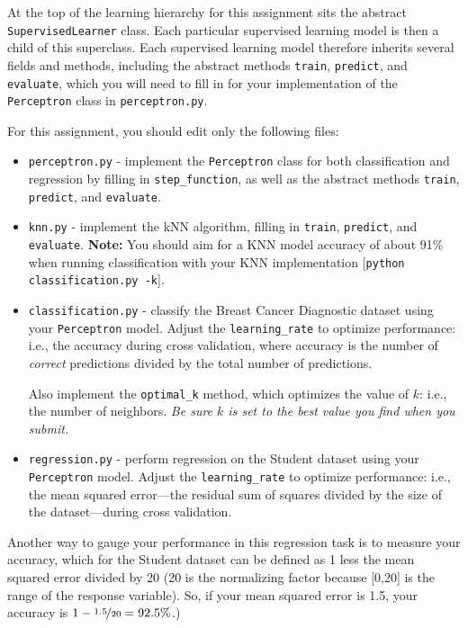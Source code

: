 \documentclass{article}
\begin{document}
At the top of the learning hierarchy for this assignment sits the abstract \verb|SupervisedLearner| class.
Each particular supervised learning model is then a child of this superclass.
Each supervised learning model therefore inherits several fields and methods,
including the abstract methods \verb|train|, \verb|predict|, and \verb|evaluate|,
which you will need to fill in for your implementation of the \verb|Perceptron| class in \verb|perceptron.py|.
\fi

For this assignment, you should edit only the following files:

\begin{itemize}
\item \verb|perceptron.py| - implement the \verb|Perceptron| class for both classification and regression by filling in
  \verb|step_function|, as well as the abstract methods \verb|train|, \verb|predict|, and \verb|evaluate|.

\item \verb|knn.py| - implement the kNN algorithm, filling in \verb|train|, \verb|predict|, and \verb|evaluate|. \textbf{Note:} You should aim for a KNN model accuracy of about 91\% when running classification with your KNN implementation [\verb|python classification.py -k|].

\item \verb|classification.py| - classify the Breast Cancer Diagnostic dataset using your \verb|Perceptron| model.
  Adjust the \verb|learning_rate| to optimize performance: i.e., the accuracy during cross validation,
  where accuracy is the number of \emph{correct\/} predictions divided by the total number of predictions.

  Also implement the \verb|optimal_k| method, which optimizes the value of $k$: i.e., the number of neighbors.
  \emph{Be sure $k$ is set to the best value you find when you submit.}

\item \verb|regression.py| - perform regression on the Student dataset using your \verb|Perceptron| model.
  Adjust the \verb|learning_rate| to optimize performance: i.e., the mean squared error---the
  residual sum of squares divided by the size of the dataset---during cross validation.
\end{itemize}

  Another way to gauge your performance in this regression task is to measure your accuracy,
  which for the Student dataset can be defined as 1 less the mean squared error divided by 20
  (20 is the normalizing factor because [0,20] is the range of the response variable).
  So, if your mean squared error is 1.5, your accuracy is $1 - \nicefrac{1.5}{20} = 92.5\%$.)
  
\end{document}
